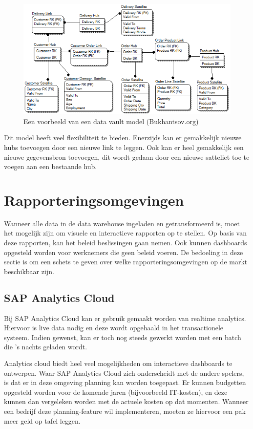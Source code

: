 \begin{figure}[h]
	\centering
	\includegraphics[scale=0.7]{../images/dvmodel.png}
	\caption{Een voorbeeld van een data vault model (Bukhantsov.org)}
	\label{fig:dvmod}
\end{figure}

Dit model heeft veel flexibiliteit te bieden. Enerzijds kan er gemakkelijk nieuwe hubs toevoegen door een nieuwe link te leggen. Ook kan er heel gemakkelijk een nieuwe gegevensbron toevoegen, dit wordt gedaan door een nieuwe satteliet toe te voegen aan een bestaande hub. 

\section{Rapporteringsomgevingen}
\label{sec:omgeving}
Wanneer alle data in de data warehouse ingeladen en getransformeerd is, moet het mogelijk zijn om visuele en interactieve rapporten op te stellen. Op basis van deze rapporten, kan het beleid beslissingen gaan nemen. Ook kunnen dashboards opgesteld worden voor werknemers die geen beleid voeren. De bedoeling in deze sectie is om een schets te geven over welke rapporteringsomgevingen op de markt beschikbaar zijn. 

\subsection{SAP Analytics Cloud}
Bij SAP Analytics Cloud kan er gebruik gemaakt worden van realtime analytics. Hiervoor is live data nodig en deze wordt opgehaald in het transactionele systeem. Indien gewenst, kan er toch nog steeds gewerkt worden met een batch die 's nachts geladen wordt. 

Analytics cloud biedt heel veel mogelijkheden om interactieve dashboards te ontwerpen. Waar SAP Analytics Cloud zich onderscheidt met de andere spelers, is dat er in deze omgeving planning kan worden toegepast. Er kunnen budgetten opgesteld worden voor de komende jaren (bijvoorbeeld IT-kosten), en deze kunnen dan vergeleken worden met de actuele kosten op dat momenten. Wanneer een bedrijf deze planning-feature wil implementeren, moeten ze hiervoor een pak meer geld op tafel leggen. 

